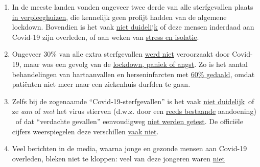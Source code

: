 \begin{enumerate}
{  4\%} van de overledene had geen ernstige bestaande ziekten. Het
  sterfte-profiel komt dus in wezen overeen met de
  \href{https://www.vienna.at/analyse-zeigt-covid-19-opferkurve-entspricht-normaler-mortalitaet/6581246}{normale
  sterfte}.
\item
  In de meeste landen vonden ongeveer twee derde van alle sterfgevallen
  plaats
  \href{https://swprs.org/studies-on-covid-19-lethality/\#care-homes}{in
  verpleeghuizen}, die kennelijk geen profijt hadden van de algemene
  lockdown. Bovendien is het vaak
  \href{https://www.hsj.co.uk/commissioning/thousands-of-extra-deaths-outside-hospital-not-attributed-to-covid-19/7027459.article}{niet
  duidelijk} of deze mensen inderdaad aan Covid-19 zijn overleden, of
  aan weken van
  \href{https://www.theguardian.com/world/2020/jun/05/covid-19-causing-10000-dementia-deaths-beyond-infections-research-says}{stress
  en isolatie}.
\item
  Ongeveer 30\% van alle extra sterfgevallen
  \href{https://www.ons.gov.uk/peoplepopulationandcommunity/birthsdeathsandmarriages/deaths/articles/analysisofdeathregistrationsnotinvolvingcoronaviruscovid19englandandwales28december2019to1may2020/technicalannex}{werd
  niet} veroorzaakt door Covid-19, maar was een gevolg van de
  \href{https://www.telegraph.co.uk/global-health/science-and-disease/two-new-waves-deaths-break-nhs-new-analysis-warns/}{lockdown,
  paniek of angst}. Zo is het aantal behandelingen van hartaanvallen en
  herseninfarcten met
  \href{https://www.nytimes.com/2020/04/06/well/live/coronavirus-doctors-hospitals-emergency-care-heart-attack-stroke.html}{60\%
  gedaald}, omdat patiënten niet meer naar een ziekenhuis durfden te
  gaan.
\item
  Zelfs bij de zogenaamde ``Covid-19-sterfgevallen'' is het vaak
  \href{https://spectator.us/understand-report-figures-covid-deaths/}{niet
  duidelijk}~of ze \emph{aan} of \emph{met} het virus stierven (d.w.z.
  door een
  \href{https://www.morgenpost.de/vermischtes/article228994571/Rechtsmediziner-Alle-Corona-Toten-hatten-Vorerkrankungen.html}{reeds
  bestaande} aandoening) ~of dat ``verdachte gevallen'' eenvoudigweg
  \href{https://www.youtube.com/watch?v=V0lIWZpiRU0}{niet werden
  getest}. De officiële cijfers weerspiegelen deze verschillen
  \href{https://swprs.org/rki-relativiert-corona-todesfaelle/}{vaak
  niet}.
\item
  Veel berichten in de media, waarna jonge en gezonde mensen aan
  Covid-19 overleden, bleken niet te kloppen: veel van deze jongeren
  waren
  \href{https://www.dailymail.co.uk/news/article-8193487/Coroner-refuses-rule-COVID-19-cause-death-six-week-old-Connecticut-baby.html}{niet}

\end{enumerate}
